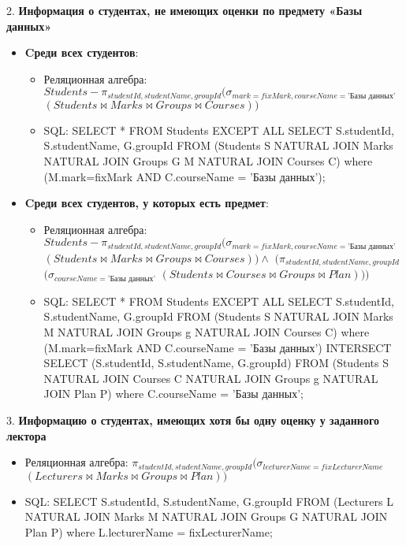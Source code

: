 \documentclass[11pt,a4paper,oneside]{article}
\begin{document}
2. \textbf{Информация о студентах, не имеющих оценки по предмету «Базы данных»}
\begin{itemize}
\item \textbf{Cреди всех студентов}:
  \begin{itemize}
  \item Реляционная алгебра: $Students - \pi_{studentId, studentName, groupId} (\sigma_{mark = fixMark, courseName = \mbox{'Базы данных'}}$ $(Students \bowtie Marks \bowtie Groups \bowtie Courses))$
  \item SQL: SELECT * FROM Students EXCEPT ALL SELECT S.studentId, S.studentName, G.groupId FROM (Students S NATURAL JOIN Marks NATURAL JOIN Groups G M NATURAL JOIN Courses C) where (M.mark=fixMark AND C.courseName = 'Базы данных');
  \end{itemize}
\item \textbf{Cреди всех студентов, у которых есть предмет}:
  \begin{itemize}
  \item Реляционная алгебра: $Students - \pi_{studentId, studentName, groupId} (\sigma_{mark = fixMark, courseName = \mbox{'Базы данных'}}$ $(Students \bowtie Marks \bowtie Groups \bowtie Courses)) \land$ $(\pi_{studentId, studentName, groupId}$ $(\sigma_{courseName = \mbox{'Базы данных'}}$ $(Students \bowtie Courses \bowtie Groups \bowtie Plan)))$
  \item SQL: SELECT * FROM Students EXCEPT ALL SELECT S.studentId, S.studentName, G.groupId FROM (Students S NATURAL JOIN Marks M NATURAL JOIN Groups g NATURAL JOIN Courses C) where (M.mark=fixMark AND C.courseName = 'Базы данных') INTERSECT SELECT (S.studentId, S.studentName, G.groupId) FROM (Students S NATURAL JOIN Courses C NATURAL JOIN Groups g NATURAL JOIN Plan P) where C.courseName = 'Базы данных';
  \end{itemize}
\end{itemize}

3. \textbf{Информацию о студентах, имеющих хотя бы одну оценку у заданного лектора}
\begin{itemize}
\item Реляционная алгебра: $\pi_{studentId, studentName, groupId} (\sigma_{lecturerName = fixLecturerName}$ $(Lecturers \bowtie Marks \bowtie Groups \bowtie Plan))$
\item SQL: SELECT S.studentId, S.studentName, G.groupId FROM (Lecturers L NATURAL JOIN Marks M NATURAL JOIN Groups G NATURAL JOIN Plan P) where L.lecturerName = fixLecturerName;
\end{itemize}
\end{document}
